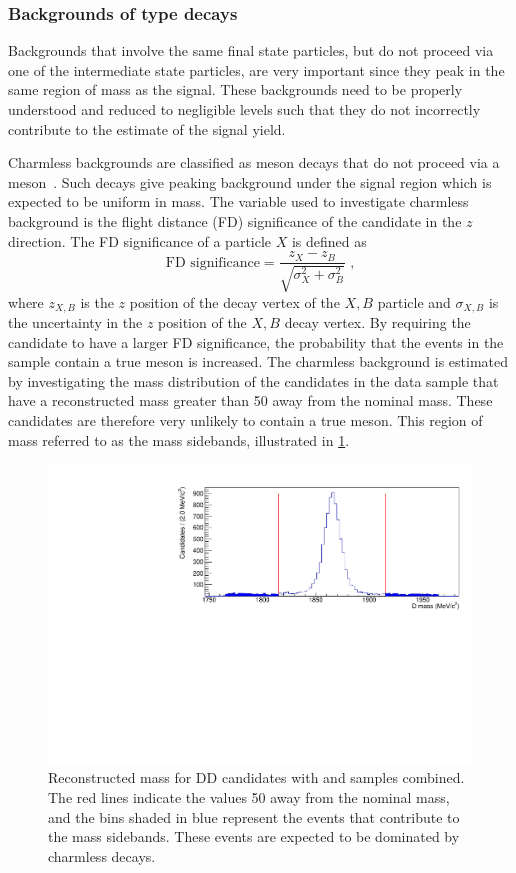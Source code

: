 \subsubsection{Backgrounds of type \boldmath {} decays}
\label{sec:backgrounds:charmless}

Backgrounds that involve the same final state particles, but do not proceed via one of the intermediate state particles, are very important since they peak in the same region of \Bm mass as the signal. These backgrounds need to be properly understood and reduced to negligible levels such that they do not incorrectly contribute to the estimate of the signal yield. 

Charmless backgrounds are classified as \Bm meson decays that do not proceed via a \Dz meson~\eg \decay{\Bm}{\Kstarm\pip\pim}. Such decays give peaking background under the signal region which is expected to be uniform in \Dz mass. The variable used to investigate charmless background is the flight distance (FD) significance of the \Dz candidate in the $z$ direction. The FD significance of a particle $X$ is defined as
\begin{equation}
\text{FD significance} = \frac{z_X - z_B}{\sqrt{\sigma_X^2 + \sigma_B^2}} \text{ ,}
\label{FDdefinition}
\end{equation}
where $z_{X,B}$ is the $z$ position of the decay vertex of the $X,B$ particle and $\sigma_{X,B}$ is the uncertainty in the $z$ position of the $X,B$ decay vertex. By requiring the \Dz candidate to have a larger FD significance, the probability that the events in the sample contain a true \Dz meson is increased. The charmless background is estimated by investigating the \Bm mass distribution of the candidates in the data sample that have a reconstructed \Dz mass greater than 50 \mevcc away from the nominal \Dz mass. These candidates are therefore very unlikely to contain a true \Dz meson. This region of \Dz mass referred to as the \Dz mass sidebands, illustrated in \fig\ref{Dsidebands}.

\begin{figure}
\centering
\includegraphics[width=0.8\linewidth]{figures/backgrounds/Dsidebands.pdf}
\caption{Reconstructed \Dz mass for \kpi DD candidates with \runone and \runtwo samples combined. The red lines indicate the values 50 \mevcc away from the nominal \Dz mass, and the bins shaded in blue represent the events that contribute to the \Dz mass sidebands. These events are expected to be dominated by charmless decays.}
\label{Dsidebands}
\end{figure}

